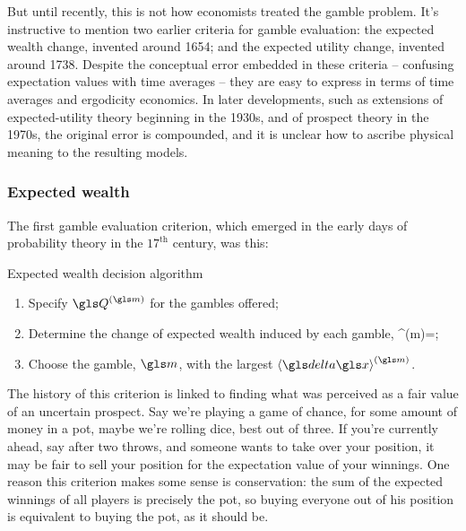 But until recently, this is not how economists treated the gamble problem. It's instructive
to mention two earlier criteria for gamble evaluation: the expected wealth change, 
invented around 1654; and the expected utility change, invented around 1738. Despite the 
conceptual error embedded in these criteria -- confusing expectation values with time 
averages -- they are easy to express in terms of time averages and ergodicity economics. 
In later developments, such as extensions of expected-utility theory beginning in the 1930s, 
and of prospect theory in the 1970s, the original error is compounded, and it is unclear 
how to ascribe physical meaning to the resulting models.


%
\subsubsection{Expected wealth}
The first gamble evaluation criterion, which emerged in the early 
days of probability theory in the $17^\text{th}$ century, was this:

\begin{keypts}{Expected wealth decision algorithm}
\begin{enumerate}
\item Specify $\Q^{(\m)}$ for the gambles offered;
\item Determine the change of expected wealth induced by each gamble,
\be
\ave{\d\x}^{(m)}=;
\ee
\item Choose the gamble, $\m$, with the largest $\ave{\d\x}^{(\m)}$.
\end{enumerate}
\end{keypts}

The history of this criterion is linked to finding what was perceived as a fair value
of an uncertain prospect. Say we're playing a game of chance, for some amount of 
money in a pot, maybe we're rolling dice, best out of three. If you're currently ahead, 
say after two throws, and someone wants to take over your 
position, it may be fair to sell your position for the expectation value of your 
winnings. One reason this criterion makes some sense is conservation: the sum 
of the expected winnings of all players is precisely the pot, so buying everyone 
out of his position is equivalent to buying the pot, as it should be.

